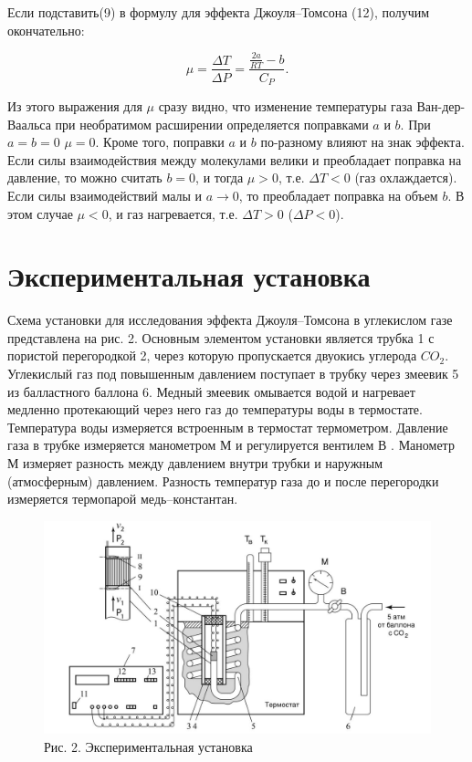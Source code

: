 \documentclass[a4paper,12pt]{article}
\begin{document}
Если подставить(9) в формулу для эффекта Джоуля–Томсона (12), получим окончательно:

\begin{equation}
\mu = \frac{\Delta T}{\Delta P} = \frac{\frac{2a}{RT} - b}{C_P}.
\end{equation}

Из этого выражения для $\mu$ сразу видно, что изменение температуры газа Ван-дер-Ваальса при необратимом расширении определяется поправками $a$ и $b$. При $a = b = 0$ $\mu = 0$. Кроме того, поправки $a$ и $b$ по-разному влияют на знак эффекта. Если силы взаимодействия между молекулами велики и преобладает поправка на давление, то можно считать $b = 0$, и тогда $\mu > 0$, т.е. $\Delta T < 0$ (газ охлаждается). Если силы взаимодействий малы и $a \to 0$, то преобладает поправка на объем $b$. В этом случае $\mu < 0$, и газ нагревается, т.е. $\Delta T > 0$ ($\Delta P < 0$).




\section{Экспериментальная установка}
Схема установки для исследования эффекта Джоуля–Томсона в углекислом газе
представлена на рис. 2. Основным элементом установки является трубка 1 с пористой
перегородкой 2, через которую пропускается двуокись углерода $CO_2$. Углекислый газ под повышенным давлением поступает в трубку через змеевик 5
из балластного баллона 6. Медный змеевик омывается водой и нагревает медленно
протекающий через него газ до температуры воды в термостате. Температура воды
измеряется встроенным в термостат термометром. Давление газа в трубке измеряется манометром М и регулируется вентилем В . Манометр М измеряет разность между давлением внутри трубки и наружным (атмосферным) давлением. Разность температур газа до и после перегородки измеряется термопарой медь–константан.
\begin{figure}[h!]
        \centering
        \includegraphics[scale=0.3]{ustj.jpg}
        \caption{
        Рис. 2. Экспериментальная установка
        }
 \end{figure} 
\end{document}
